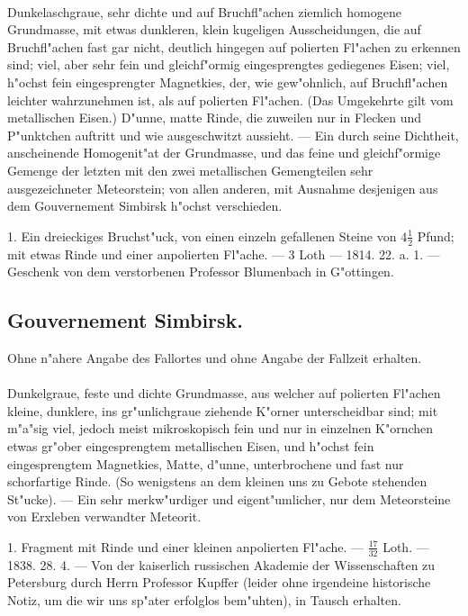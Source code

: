 \documentclass[a4paper, 11pt, oneside, polutonikogreek, german]{article}
\begin{document}
\paragraph{}
Dunkelaschgraue, sehr dichte und auf Bruchfl"achen ziemlich homogene Grundmasse, mit etwas dunkleren, klein kugeligen Ausscheidungen, die auf Bruchfl"achen fast gar nicht, deutlich hingegen auf polierten Fl"achen zu erkennen sind; viel, aber sehr fein und gleichf"ormig eingesprengtes gediegenes Eisen; viel, h"ochst fein eingesprengter Magnetkies, der, wie gew"ohnlich, auf Bruchfl"achen leichter wahrzunehmen ist, als auf polierten Fl"achen. (Das Umgekehrte gilt vom metallischen Eisen.) D"unne, matte Rinde, die zuweilen nur in Flecken und P"unktchen auftritt und wie ausgeschwitzt aussieht. --- Ein durch seine Dichtheit, anscheinende Homogenit"at der Grundmasse, und das feine und gleichf"ormige Gemenge der letzten mit den zwei metallischen Gemengteilen sehr ausgezeichneter Meteorstein; von allen anderen, mit Ausnahme desjenigen aus dem Gouvernement Simbirsk h"ochst verschieden.

1. Ein dreieckiges Bruchst"uck, von einen einzeln gefallenen Steine von $4\frac{1}{2}$ Pfund; mit etwas Rinde und einer anpolierten Fl"ache. --- 3 Loth --- 1814. 22. a. 1. --- Geschenk von dem verstorbenen Professor Blumenbach in G"ottingen.
\subsection{Gouvernement Simbirsk.}
\begin{center}
\small
Ohne n"ahere Angabe des Fallortes und ohne Angabe der Fallzeit erhalten.
\end{center}
\paragraph{}
Dunkelgraue, feste und dichte Grundmasse, aus welcher auf polierten Fl"achen kleine, dunklere, ins gr"unlichgraue ziehende K"orner unterscheidbar sind; mit m"a"sig viel, jedoch meist mikroskopisch fein und nur in einzelnen K"ornchen etwas gr"ober eingesprengtem metallischen Eisen, und h"ochst fein eingesprengtem Magnetkies, Matte, d"unne, unterbrochene und fast nur schorfartige Rinde. (So wenigstens an dem kleinen uns zu Gebote stehenden St"ucke). --- Ein sehr merkw"urdiger und eigent"umlicher, nur dem Meteorsteine von Erxleben verwandter Meteorit.

1. Fragment mit Rinde und einer kleinen anpolierten Fl"ache. --- $\frac{17}{32}$ Loth. --- 1838. 28. 4. --- Von der kaiserlich russischen Akademie der Wissenschaften zu Petersburg durch Herrn Professor Kupffer (leider ohne irgendeine historische Notiz, um die wir uns sp"ater erfolglos bem"uhten), in Tausch erhalten.
\end{document}
